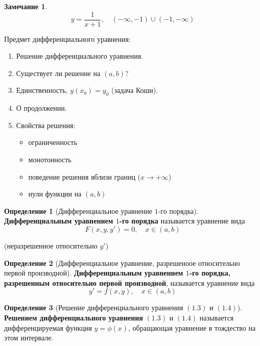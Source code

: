 \documentclass{report}
\theoremstyle{definition}
\newtheorem{definition}{Определение}[section]
\newtheorem*{remark}{Замечание}
\begin{document}
\begin{remark}
    \begin{equation*}
        y = \frac{1}{x+1}, \quad (-\infty, -1) \cup (-1, -\infty)
    \end{equation*}

    Предмет дифференциального уравнения:
    \begin{enumerate}
        \item Решение дифференциального уравнения.
        \item Существует ли решение на $(a,b)$?
        \item Единственность, $y(x_0)=y_0$ (задача Коши).
        \item О продолжении.
        \item Свойства решения: \begin{itemize}
                  \item ограниченность
                  \item монотонность
                  \item поведение решения вблизи границ ($x \rightarrow +\infty$)
                  \item нули функции на $(a,b)$
              \end{itemize}
    \end{enumerate}
\end{remark}

\begin{definition}[Дифференциальное уравнение $1$-го порядка]
    \textbf{Дифференциальным уравнением $1$-го порядка} называется уравнение вида
    \begin{equation}
        F(x,y,y')=0, \quad x \in (a,b)
    \end{equation}
    \begin{center}
        (неразрешенное относительно $y'$)
    \end{center}
\end{definition}

\begin{definition}[Дифференциальное уравнение, разрешеноое относительно первой производной]
    \textbf{Дифференциальным уравнением $1$-го порядка, разрешенным относительно первой производной}, называется уравнение вида
    \begin{equation}
        y'=f(x,y), \quad x \in (a,b)
    \end{equation}
\end{definition}

\begin{definition}[Решение дифференциального уравнения $(1.3)$ и $(1.4)$]
    \textbf{Решением дифференциального уравнения} $(1.3)$ и $(1.4)$ называется дифференцируемая функция $y = \phi(x)$, обращающая уравнение в тождество на этом интервале.
\end{definition}
\end{document}
